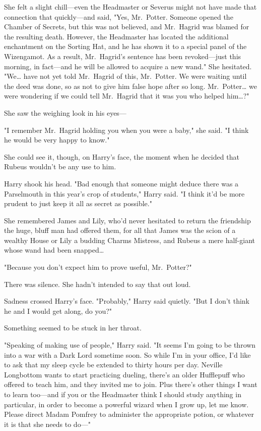 She felt a slight chill---even the Headmaster or Severus might not have made
that connection that quickly---and said, "Yes, Mr.~Potter. Someone opened the
Chamber of Secrets, but this was not believed, and Mr.~Hagrid was blamed for
the resulting death. However, the Headmaster has located the additional
enchantment on the Sorting Hat, and he has shown it to a special panel of the
Wizengamot. As a result, Mr.~Hagrid's sentence has been revoked---just this
morning, in fact---and he will be allowed to acquire a new wand." She
hesitated. "We{\ldots} have not yet told Mr.~Hagrid of this, Mr.~Potter. We
were waiting until the deed was done, so as not to give him false hope after so
long. Mr.~Potter{\ldots} we were wondering if we could tell Mr.~Hagrid that it
was you who helped him{\ldots}?"

She saw the weighing look in his eyes---

"I remember Mr.~Hagrid holding you when you were a baby," she said. "I think he
would be very happy to know."

She could see it, though, on Harry's face, the moment when he decided that
Rubeus wouldn't be any use to him.

Harry shook his head. "Bad enough that someone might deduce there was a
Parselmouth in this year's crop of students," Harry said. "I think it'd be more
prudent to just keep it all as secret as possible."

She remembered James and Lily, who'd never hesitated to return the friendship
the huge, bluff man had offered them, for all that James was the scion of a
wealthy House or Lily a budding Charms Mistress, and Rubeus a mere half-giant
whose wand had been snapped{\ldots}

"Because you don't expect him to prove useful, Mr.~Potter?"

There was silence. She hadn't intended to say that out loud.

Sadness crossed Harry's face. "Probably," Harry said quietly. "But I don't
think he and I would get along, do you?"

Something seemed to be stuck in her throat.

"Speaking of making use of people," Harry said. "It seems I'm going to be
thrown into a war with a Dark Lord sometime soon. So while I'm in your office,
I'd like to ask that my sleep cycle be extended to thirty hours per day.
Neville Longbottom wants to start practicing dueling, there's an older
Hufflepuff who offered to teach him, and they invited me to join. Plus there's
other things I want to learn too---and if you or the Headmaster think I should
study anything in particular, in order to become a powerful wizard when I grow
up, let me know. Please direct Madam Pomfrey to administer the appropriate
potion, or whatever it is that she needs to do---"

